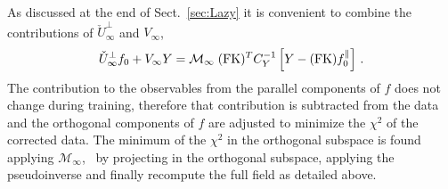 As discussed at the end of Sect.~\ref{sec:Lazy} it is convenient to 
combine the contributions of $\check{U}^\perp_{\infty}$ and $V_{\infty}$,
\begin{align}
    \label{eq:DataCorrectedInferenceAtInfty}
    \check{U}^{\perp}_{\infty} f_{0} + V_{\infty} Y 
        = \mathcal{M}_{\infty}\; (\mathrm{FK})^T C_Y^{-1} \left[Y - (\mathrm{FK}) f_{0}^{\parallel}\right]\, .
\end{align}
The contribution to the observables from the parallel components of $f$ does not change during training, 
therefore that contribution is subtracted from the data and the orthogonal components of $f$ are adjusted to 
minimize the $\chi^2$ of the corrected data. The minimum of the $\chi^2$ in the orthogonal subspace is found
applying $\mathcal{M}_{\infty}$, \ie\ by projecting in the orthogonal subspace, applying the pseudoinverse and 
finally recompute the full field as detailed above. 

